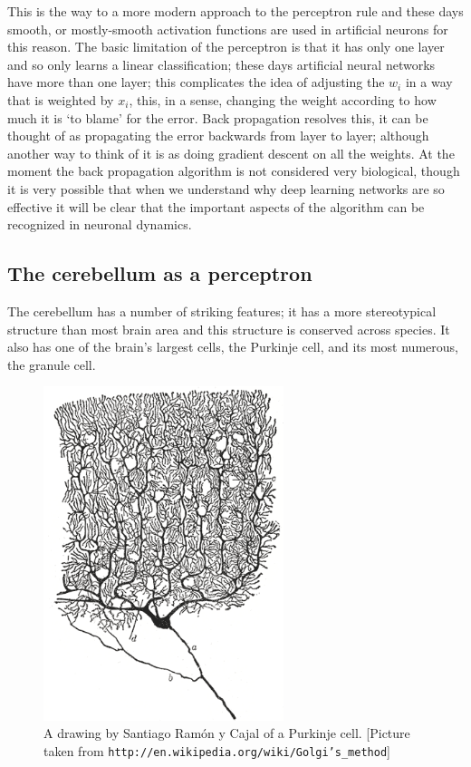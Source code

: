 \documentclass[12pt]{article}
\begin{document}
This is the way to a more modern approach to the perceptron rule and
these days smooth, or mostly-smooth activation functions are used in
artificial neurons for this reason. The basic limitation of the
perceptron is that it has only one layer and so only learns a linear
classification; these days artificial neural networks have more than
one layer; this complicates the idea of adjusting the $w_i$ in a way
that is weighted by $x_i$, this, in a sense, changing the weight
according to how much it is \lq{}to blame\rq{} for the error. Back
propagation resolves this, it can be thought of as propagating the
error backwards from layer to layer; although another way to think of
it is as doing gradient descent on all the weights. At the moment the
back propagation algorithm is not considered very biological, though
it is very possible that when we understand why deep learning networks
are so effective it will be clear that the important aspects of the
algorithm can be recognized in neuronal dynamics.

\subsection*{The cerebellum as a perceptron}

The cerebellum has a number of striking features; it has a more
stereotypical structure than most brain area and this structure is
conserved across species. It also has one of the brain's largest cells,
the Purkinje cell, and its most numerous, the granule cell.

\begin{figure}
\begin{center}
\includegraphics[width=7cm]{Purkinje_cell_by_Cajal.png}
\end{center}
\caption{A drawing by Santiago Ram\'{o}n y Cajal of a Purkinje cell. [Picture taken from \texttt{http://en.wikipedia.org/wiki/Golgi's\_method}]\label{fig:PC}}
\end{figure}
\end{document}
